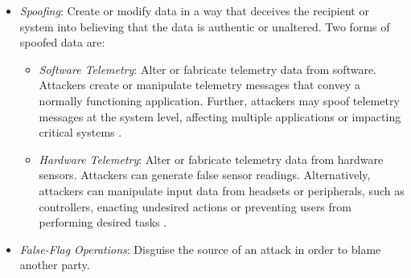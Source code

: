      \begin{itemize}
     \itemsep0.5em 
     \item \emph{Spoofing}: Create or modify data in a way that deceives the recipient or system into believing that the data is authentic or unaltered. %
     Two forms of spoofed data are:

         \begin{itemize}[leftmargin=3mm]
         \itemsep0em
         \item \emph{Software Telemetry}: Alter or fabricate telemetry data from software. Attackers create or manipulate telemetry messages that convey a normally functioning application. Further, attackers may spoof telemetry messages at the system level, affecting multiple applications or impacting critical systems \cite{chandio2024stealthy}. %
         
         \item \emph{Hardware Telemetry}: Alter or fabricate telemetry data from hardware sensors. Attackers can generate false sensor readings. Alternatively, attackers can manipulate input data from \MR headsets or peripherals, such as controllers, enacting undesired actions or preventing users from performing desired tasks \cite{tu2018injected, chandio2024stealthy}. %
         \end{itemize}
     
     \item \emph{False-Flag Operations}: Disguise the source of an attack in order to blame another party. %
     \end{itemize} 

